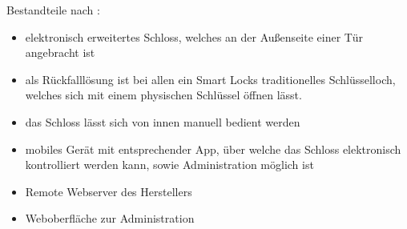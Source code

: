 		Bestandteile nach \citeauthor{Ho2016}:
		\begin{itemize}
		    \item elektronisch erweitertes Schloss, welches an der Außenseite einer Tür angebracht ist
		    \item als Rückfalllösung ist bei allen ein Smart Locks traditionelles Schlüsselloch, welches sich mit einem physischen Schlüssel öffnen lässt.
		    \item das Schloss lässt sich von innen manuell bedient werden
		    \item mobiles Gerät mit entsprechender App, über welche das Schloss elektronisch kontrolliert werden kann, sowie Administration möglich ist
		    \item Remote Webserver des Herstellers
		    \item Weboberfläche zur Administration
		\end{itemize}

